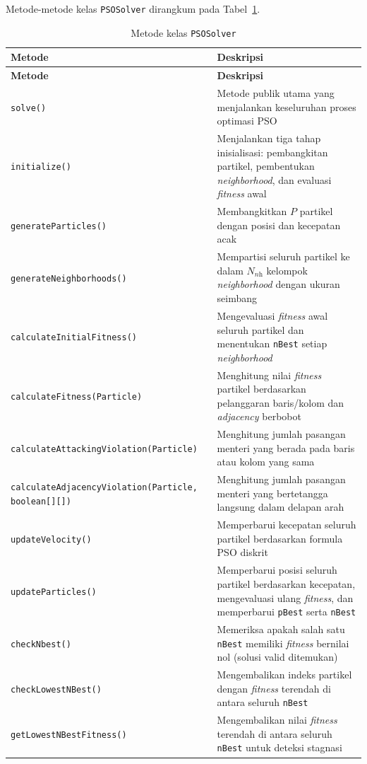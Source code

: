 Metode-metode kelas \texttt{PSOSolver} dirangkum pada Tabel~\ref{tab:method-pso}.

\begin{longtable}{>{\raggedright\arraybackslash}p{6cm} >{\raggedright\arraybackslash}p{7.5cm}}
	\caption{Metode kelas \texttt{PSOSolver}}
	\label{tab:method-pso} \\
	\toprule
	\textbf{Metode} & \textbf{Deskripsi} \\
	\midrule
	\endfirsthead
	\toprule
	\textbf{Metode} & \textbf{Deskripsi} \\
	\midrule
	\endhead
	\bottomrule
	\endfoot
	\texttt{solve()} & Metode publik utama yang menjalankan keseluruhan proses optimasi PSO \\
	\midrule
	\texttt{initialize()} & Menjalankan tiga tahap inisialisasi: pembangkitan partikel, pembentukan \textit{neighborhood}, dan evaluasi \textit{fitness} awal \\
	\midrule
	\texttt{generateParticles()} & Membangkitkan $P$ partikel dengan posisi dan kecepatan acak \\
	\midrule
	\texttt{generateNeighborhoods()} & Mempartisi seluruh partikel ke dalam $N_{\textit{nh}}$ kelompok \textit{neighborhood} dengan ukuran seimbang \\
	\midrule
	\texttt{calculateInitialFitness()} & Mengevaluasi \textit{fitness} awal seluruh partikel dan menentukan \texttt{nBest} setiap \textit{neighborhood} \\
	\midrule
	\texttt{calculateFitness(Particle)} & Menghitung nilai \textit{fitness} partikel berdasarkan pelanggaran baris/kolom dan \textit{adjacency} berbobot \\
	\midrule
	\texttt{calculateAttackingViolation}\newline\texttt{(Particle)} & Menghitung jumlah pasangan menteri yang berada pada baris atau kolom yang sama \\
	\midrule
	\texttt{calculateAdjacencyViolation}\newline\texttt{(Particle, boolean[][])} & Menghitung jumlah pasangan menteri yang bertetangga langsung dalam delapan arah \\
	\midrule
	\texttt{updateVelocity()} & Memperbarui kecepatan seluruh partikel berdasarkan formula PSO diskrit \\
	\midrule
	\texttt{updateParticles()} & Memperbarui posisi seluruh partikel berdasarkan kecepatan, mengevaluasi ulang \textit{fitness}, dan memperbarui \texttt{pBest} serta \texttt{nBest} \\
	\midrule
	\texttt{checkNbest()} & Memeriksa apakah salah satu \texttt{nBest} memiliki \textit{fitness} bernilai nol (solusi valid ditemukan) \\
	\midrule
	\texttt{checkLowestNBest()} & Mengembalikan indeks partikel dengan \textit{fitness} terendah di antara seluruh \texttt{nBest} \\
	\midrule
	\texttt{getLowestNBestFitness()} & Mengembalikan nilai \textit{fitness} terendah di antara seluruh \texttt{nBest} untuk deteksi stagnasi \\
	\bottomrule
\end{longtable}

